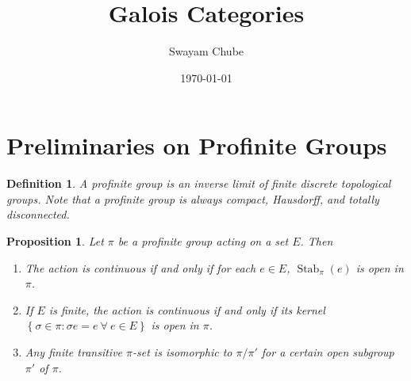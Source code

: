 \documentclass[10pt]{article}
\title{Galois Categories}
\author{Swayam Chube}
\date{\today}
\theoremstyle{thmstyle}
\newtheorem{proposition}[theorem]{Proposition}
\theoremstyle{defstyle}
\newtheorem{definition}[theorem]{Definition}
\newcommand{\Stab}{\operatorname{Stab}}
\begin{document}
\maketitle

\section{Preliminaries on Profinite Groups}

\begin{definition}
    A profinite group is an inverse limit of finite discrete topological groups. Note that a profinite group is always compact, Hausdorff, and totally disconnected.
\end{definition}

\begin{proposition}
    Let $\pi$ be a profinite group acting on a set $E$. Then 
    \begin{enumerate}[label=(\arabic*)]
        \item The action is continuous if and only if for each $e\in E$, $\Stab_{\pi}(e)$ is open in $\pi$.
        \item If $E$ is finite, the action is continuous if and only if its kernel $\left\{\sigma\in\pi\colon \sigma e = e~\forall~e\in E\right\}$ is open in $\pi$.
        \item Any finite transitive $\pi$-set is isomorphic to $\pi/\pi'$ for a certain open subgroup $\pi'$ of $\pi$.
    \end{enumerate}
\end{proposition}
\end{document}
